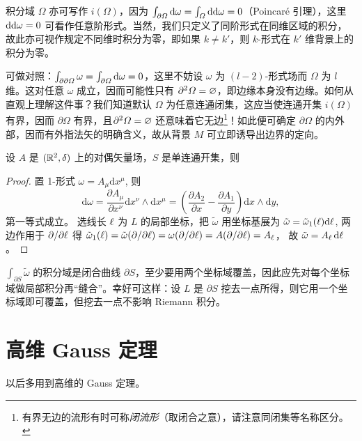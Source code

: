 积分域 $\Omega$ 亦可写作 $i(\Omega)$，因为 $\int_{\partial\Omega}\dd\omega=\int_\Omega \dd\dd\omega=0$（Poincaré 引理），这里$\dd\dd\omega=0$ 可看作任意阶形式。当然，我们只定义了同阶形式在同维区域的积分，故此亦可视作规定不同维时积分为零，即如果 $k\neq k'$，则 $k$-形式在 $k'$ 维背景上的积分为零。

可做对照：$\int_{\partial\partial\Omega}\omega=\int_{\partial\Omega} \dd\omega=0$，这里不妨设 $\omega$ 为 $(l-2)$-形式场而 $\Omega$ 为 $l$ 维。这对任意 $\omega$ 成立，因而可能性只有 $\partial^2\Omega=\varnothing$，即边缘本身没有边缘。如何从直观上理解这件事？我们知道默认 $\Omega$ 为任意连通闭集，这应当使连通开集 $i(\Omega)$ 有界，因而 $\partial\Omega$ 有界，且$\partial^2\Omega=\varnothing$ 还意味着它无边\footnote{有界无边的流形有时可称\textit{闭流形}（取闭合之意），请注意同闭集等名称区分。}！如此便可确定 $\partial\Omega$ 的内外部，因而有外指法矢的明确含义，故从背景 $M$ 可立即诱导出边界的定向。

\begin{eg}[Green]
    设 $A$ 是 $(\mathbb{R}^2,\delta)$ 上的对偶矢量场，$S$ 是单连通开集，则
\end{eg}
\begin{proof}
    置 1-形式 $\omega=A_\mu\mathrm{d} x^\mu$, 则
\[\mathrm{d} \omega  =\frac{\partial A_\mu}{\partial x^\nu} \mathrm{d} x^\nu \wedge \mathrm{d} x^\mu=\left(\frac{\partial A_2}{\partial x}-\frac{\partial A_1}{\partial y}\right) \mathrm{d} x \wedge \mathrm{d} y,\]
第一等式成立。
选线长 $\ell$ 为 $L$ 的局部坐标，把 $\tilde{\omega}$ 用坐标基展为 $\tilde{\omega}=\tilde{\omega}_1(\ell)\mathrm{d} \ell$, 两边作用于 $\partial / \partial \ell$ 得
$\tilde{\omega}_1(\ell)=\tilde{\omega}(\partial / \partial \ell)=\omega(\partial / \partial \ell)=A(\partial / \partial \ell)=A_\ell$，
故 $\tilde{\omega}=A_\ell\, \mathrm{d} \ell$。
\end{proof}
\begin{remark}
    $\int_{\partial S} \tilde{\omega}$ 的积分域是闭合曲线 $\partial S$，至少要用两个坐标域覆盖，因此应先对每个坐标域做局部积分再“缝合”。幸好可这样：设 $L$ 是 $\partial S$ 挖去一点所得，则它用一个坐标域即可覆盖，但挖去一点不影响 Riemann 积分。
\end{remark}


\section{高维 Gauss 定理}
以后多用到高维的 Gauss 定理。




